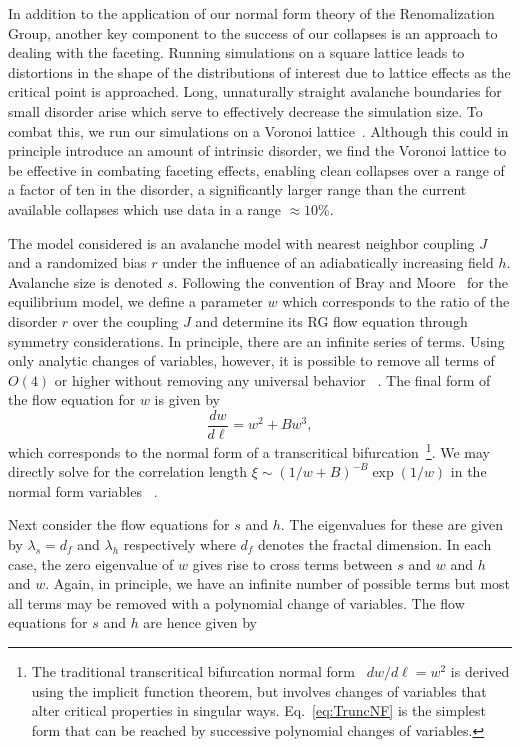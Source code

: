 \documentclass[reprint,amsmath,amssymb,aps,floatfix, prl]{revtex4-1}
\begin{document}
%
In addition to the application of our normal form theory of the Renomalization Group, another key component to the success of our collapses is an approach to dealing with the faceting. Running simulations on a square lattice leads to distortions in the shape of the distributions of interest due to lattice effects as the critical point is approached. Long, unnaturally straight avalanche boundaries for small disorder arise which serve to effectively decrease the simulation size. To combat this, we run our simulations on a Voronoi lattice~\cite[Section~\ref{supp-app:sims}]{RFIM2Dsupp}.  Although this could in principle introduce an amount of intrinsic disorder, we find the Voronoi lattice to be effective in combating faceting effects, enabling clean collapses over a range of a factor of ten in the disorder, a significantly larger range than the current available collapses which use data in a range $\approx 10\%$.\par
%
The model considered is an avalanche model with nearest neighbor coupling $J$ and a randomized bias $r$ under the influence of an adiabatically increasing field $h$. Avalanche size is denoted $s$. Following the convention of Bray and Moore~\cite{BrayMoore85} for the equilibrium model, we define a parameter $w$ which corresponds to the ratio of the disorder $r$ over the coupling $J$ and determine its RG flow equation through symmetry considerations. In principle, there are an infinite series of terms. Using only analytic changes of variables, however, it is possible to remove all terms of $O(4)$ or higher without removing any universal behavior ~\cite[Section~\ref{supp-app:normalform}]{RFIM2Dsupp}. The final form of the flow equation for $w$ is given by 
%
\begin{equation}
	\label{eq:TruncNF}
	\frac{dw}{d\ell}=w^2+B w^3 ,
\end{equation}
\noindent which corresponds to the normal form of a transcritical bifurcation~\footnote{The traditional transcritical bifurcation normal form~\cite{Strogatz14} $dw/d\ell = w^2$ is derived using the implicit function theorem, but involves changes of variables that alter critical properties in singular ways. Eq.~\ref{eq:TruncNF} is the simplest form that can be reached by successive polynomial changes of variables.}. We may directly solve for the correlation length $\xi\sim(1/w + B)^{-B}\exp(1/w)$ in the normal form variables ~\cite[Section~\ref{supp-app:correlation}]{RFIM2Dsupp}.\par
%
Next consider the flow equations for $s$ and $h$. The eigenvalues for these are given by $\lambda_s=d_f$ and $\lambda_h$ respectively where $d_f$ denotes the fractal dimension. In each case, the zero eigenvalue of $w$ gives rise to cross terms between $s$ and $w$ and $h$ and $w$. Again, in principle, we have an infinite number of possible terms but most all terms may be removed with a polynomial change of variables.   The flow equations for $s$ and $h$ are hence given by
\end{document}
